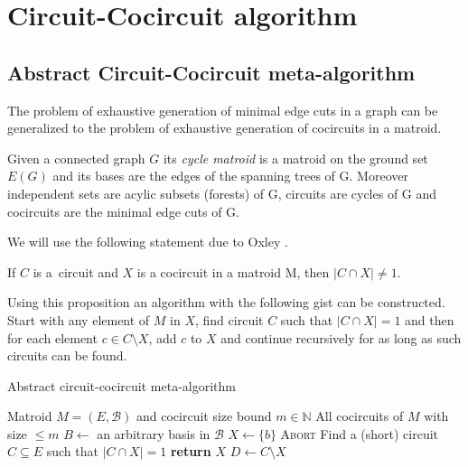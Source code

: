 \chapter{Circuit-Cocircuit algorithm}
\label{ch:algorithm}

\section{Abstract Circuit-Cocircuit meta-algorithm}

The problem of exhaustive generation of minimal edge cuts in \linebreak a graph can be generalized to the problem of exhaustive generation of cocircuits in a matroid.

\begin{defn}
	\label{cycle_matroid}
	Given a connected graph $G$ its \textit{cycle matroid} is a matroid on the ground set $E(G)$ and its bases are the edges of the spanning trees of G. Moreover independent sets are acylic subsets (forests) of G, circuits are cycles of G and cocircuits are the minimal edge cuts of G.
\end{defn}

We will use the following statement due to Oxley \cite{oxley2006matroid}.

\begin{prop}
	\label{prop_circuit-cocircuit}
	If $C$ is a~circuit and $X$ is a cocircuit in a matroid M, then $\lvert C \cap X \rvert \neq 1$.
\end{prop}

Using this proposition an algorithm with the following gist can be constructed. Start with any element of $M$ in $X$, find circuit $C$ such that $\lvert C \cap X \rvert = 1$ and then for each element $c \in C \setminus X$, add $c$ to $X$ and continue recursively for as long as such circuits can be found.

\clearpage

\begin{algorithm}
	\caption{Abstract circuit-cocircuit meta-algorithm}
	\label{meta-algorithm}
\begin{algorithmic}[1]
	\Require Matroid $M = (E, \mathcal{B})$ and cocircuit size bound $m \in \mathbb{N}$
	\Ensure All cocircuits of $M$ with size $\leq m$
	\State $B \leftarrow$ an arbitrary basis in $\mathcal{B}$
		\State $X \leftarrow \{b\}$
		\State {}
	\EndFor
		\State \textsc{Abort}
	\EndIf
	\State Find a (short) circuit $C \subseteq E$ such that $\lvert C \cap X \rvert = 1$
		\State \textbf{return} $X$ 
	\Else
		\State $D \leftarrow C \setminus X$
			\State {}
		\EndFor
	\EndIf

	\EndProcedure
\end{algorithmic}
\end{algorithm}

